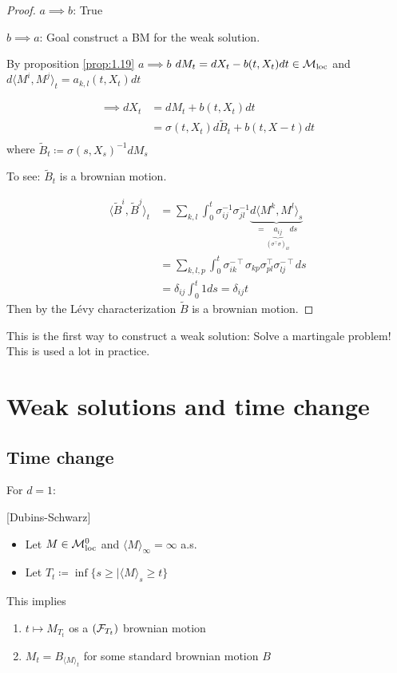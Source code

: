 \begin{proof}
    $a\implies b$: True 

    $b\implies a$: Goal construct a BM for the weak solution. 

    By proposition \ref{prop:1.19} $a\implies b$ $dM_t=dX_t-b(t,X_t)dt\in\mathcal{M}_{\text{loc}}$ and $d\langle M^i,M^j\rangle_t={a_{k,l}}(t,X_t)dt$

    \begin{align*}
        \implies dX_t&=dM_t+b(t,X_t)dt\\
        &=\sigma(t,X_t)d\tilde{B}_t+b(t,X-t)dt\\
    \end{align*}
    where $\tilde{B}_t\coloneqq \sigma(s,X_s)^{-1}dM_s$

    To see: $\tilde{B}_t$ is a brownian motion.

    \begin{align*}
        \langle \tilde{B}^i,\tilde{B}^j\rangle_t&=\sum_{k,l}\int_0^t\sigma_{ij}^{-1}\sigma_{jl}^{-1} \underbrace{d\langle M^k,M^l\rangle_s}_{=\underbrace{a_{ij}}_{(\sigma^\intercal \sigma)_{kl}}ds}\\
        &=\sum_{k,l,p}\int_0^t\sigma_{ik}^{-\intercal}\sigma_{kp}\sigma_{pl}^{\intercal}\sigma_{lj}^{-\intercal}ds\\
        &=\delta_{ij}\int_0^t 1 ds=\delta_{ij}t
    \end{align*}
    Then by the Lévy characterization $\tilde{B}$ is a brownian motion.
\end{proof}

\begin{aremark}
    This is the first way to construct a weak solution: Solve a martingale problem! This is used a lot in practice.
\end{aremark}

\section{Weak solutions and time change}

\subsection{Time change}

For $d=1$:

\begin{theorem}\label{thm:1.21}[Dubins-Schwarz]
    \begin{itemize}
        \item Let $M\in\mathcal{M}_{\text{loc}}^0$ and $\langle M\rangle_\infty=\infty$ a.s. 
        \item Let $T_t\coloneqq \inf\{s\geq |\langle M\rangle_s \geq t\}$
    \end{itemize}
    This implies    
    \begin{enumerate}
        \item $t\mapsto M_{T_t}$ os a $(\mathcal{F}_{T_t})$ brownian motion
        \item $M_t=B_{\langle M\rangle_t}$ for some standard brownian motion $B$
    \end{enumerate}
\end{theorem}

